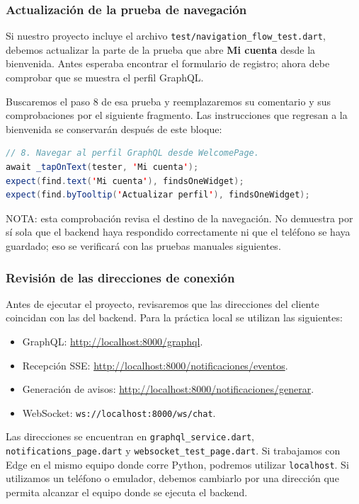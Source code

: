 \subsubsection{Actualización de la prueba de navegación}
Si nuestro proyecto incluye el archivo \texttt{test/navigation\_flow\_test.dart}, debemos actualizar la parte de la prueba que abre \textbf{Mi cuenta} desde la bienvenida. Antes esperaba encontrar el formulario de registro; ahora debe comprobar que se muestra el perfil GraphQL.

Buscaremos el paso 8 de esa prueba y reemplazaremos su comentario y sus comprobaciones por el siguiente fragmento. Las instrucciones que regresan a la bienvenida se conservarán después de este bloque:

\begin{lstlisting}[language=Java, caption={Comprobación del nuevo destino de Mi cuenta}]
// 8. Navegar al perfil GraphQL desde WelcomePage.
await _tapOnText(tester, 'Mi cuenta');
expect(find.text('Mi cuenta'), findsOneWidget);
expect(find.byTooltip('Actualizar perfil'), findsOneWidget);
\end{lstlisting}

NOTA: esta comprobación revisa el destino de la navegación. No demuestra por sí sola que el backend haya respondido correctamente ni que el teléfono se haya guardado; eso se verificará con las pruebas manuales siguientes.

\subsubsection{Revisión de las direcciones de conexión}
Antes de ejecutar el proyecto, revisaremos que las direcciones del cliente coincidan con las del backend. Para la práctica local se utilizan las siguientes:

\begin{itemize}
    \item GraphQL: \url{http://localhost:8000/graphql}.
    \item Recepción SSE: \url{http://localhost:8000/notificaciones/eventos}.
    \item Generación de avisos: \url{http://localhost:8000/notificaciones/generar}.
    \item WebSocket: \texttt{ws://localhost:8000/ws/chat}.
\end{itemize}

Las direcciones se encuentran en \texttt{graphql\_service.dart}, \texttt{notifications\_page.dart} y \texttt{websocket\_test\_page.dart}. Si trabajamos con Edge en el mismo equipo donde corre Python, podremos utilizar \texttt{localhost}. Si utilizamos un teléfono o emulador, debemos cambiarlo por una dirección que permita alcanzar el equipo donde se ejecuta el backend.

